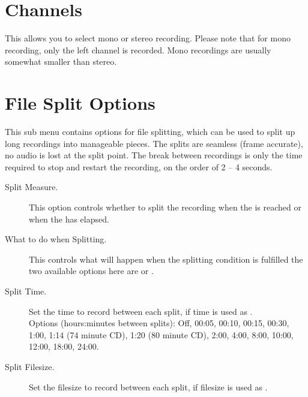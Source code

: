 \section{Channels}
  This allows you to select mono or stereo recording. Please note that
  for mono recording, only the left channel is recorded. Mono recordings
  are usually somewhat smaller than stereo.


      
\section{File Split Options}
  This sub menu contains options for file splitting, which can be used to split
  up long recordings into manageable pieces. The splits are seamless (frame
  accurate), no audio is lost at the split point. The break between recordings
  is only the time required to stop and restart the recording, on the order of
  2 -- 4 seconds.
  \begin{description}
    \item[Split Measure.]
      This option controls whether to split the recording when the
       is reached or when the
       has elapsed.

    \item[What to do when Splitting.]
      This controls what will happen when the splitting condition is
      fulfilled the two available options here are
       or .

    \item[Split Time.]
      Set the time to record between each split, if time is used as
      .\\
      Options (hours:minutes between splits): Off, 00:05, 00:10, 00:15, 00:30,
      1:00, 1:14 (74 minute CD), 1:20 (80 minute CD), 2:00, 4:00, 8:00, 10:00,
      12:00, 18:00, 24:00.

    \item[Split Filesize.]
      Set the filesize to record between each split, if filesize is used as
      .

  \end{description}

